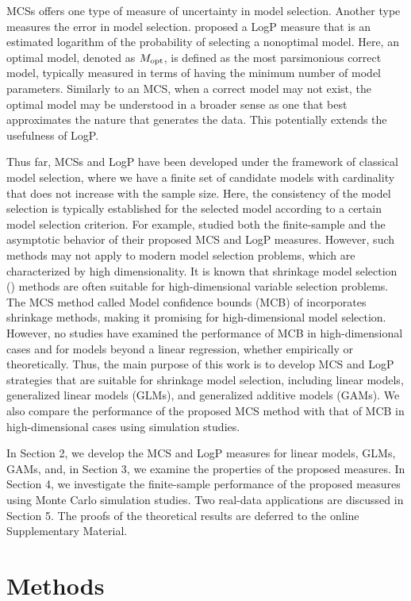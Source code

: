 \documentclass[12pt]{article} %
\theoremstyle{definition}
\begin{document}
MCSs offers one type of measure of uncertainty in model selection. Another type measures the error in model selection. \citet{Liu2021} proposed a LogP measure that is an estimated logarithm of the probability of selecting a nonoptimal model. Here, an optimal model, denoted as $M_{\rm opt}$, is defined as the most parsimonious correct model, typically measured in terms of having the minimum number of model parameters. Similarly to an MCS, when a correct model may not exist, the optimal model may be understood in a broader sense as one that best approximates the nature that generates the data. This potentially extends the usefulness of LogP.

Thus far, MCSs and LogP have been developed under the framework of classical model selection, where we have a finite set of candidate models with cardinality that does not increase with the sample size. Here, the consistency of the model selection is typically established for the selected model according to a certain model selection criterion. For example, \citet{Liu2021} studied both the finite-sample and the asymptotic behavior of their proposed MCS and LogP measures. However, such methods may not apply to modern model selection problems, which are characterized by high dimensionality. It is known that shrinkage model selection (\citet{Tibshirani1996}) methods are often suitable for high-dimensional variable selection problems. The MCS method called Model confidence bounds (MCB) of \citet{Li2019} incorporates shrinkage methods, making it promising for high-dimensional model selection. However, no studies have examined the performance of MCB in high-dimensional cases and for models beyond a linear regression, whether empirically or theoretically. Thus, the main purpose of this work is to develop MCS and LogP strategies that are suitable for shrinkage model selection, including linear models, generalized linear models (GLMs), and generalized additive models (GAMs). We also compare the performance of the proposed MCS method with that of MCB in high-dimensional cases using simulation studies.

In Section 2, we develop the MCS and LogP measures for linear models, GLMs, GAMs, and, in Section 3, we examine the properties of the proposed measures. In Section 4, we investigate the finite-sample performance of the proposed measures using Monte Carlo simulation studies. Two real-data applications are discussed in Section 5. The proofs of the theoretical results are deferred to the online Supplementary Material.
\section{Methods}
\end{document}

